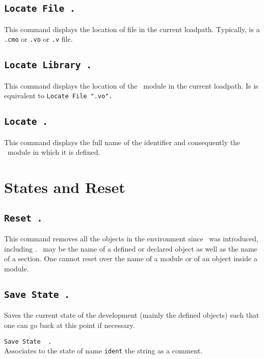 \subsection{\tt Locate File {\str}.}\label{Locate File}
This command displays the location of file {\str} in the current loadpath.
Typically, {\str} is a \texttt{.cmo} or \texttt{.vo} or \texttt{.v} file.

\subsection{\tt Locate Library {\ident}.}
This command displays the location of the \Coq\ module {\ident} in the current
loadpath. Is is equivalent to {\tt Locate File "}{\ident}{\tt .vo".}

\subsection{\tt Locate {\ident}.}
This command displays the full name of the identifier {\ident}
and consequently the \Coq\ module in which it is defined.

\section{States and Reset}

\subsection{\tt Reset \ident.}
This command removes all the objects in the environment since \ident\ 
was introduced, including \ident. \ident\ may be the name of a defined
or declared object as well as the name of a section.  One cannot reset
over the name of a module or of an object inside a module.

\begin{ErrMsgs}
\item {}
\end{ErrMsgs}

\subsection{\tt Save State \ident.}
Saves the current state of the development (mainly the defined
objects) such that one can go back at this point if necessary.

\begin{Variants}
\item {\tt Save State \ident\ \str.} \\ 
  Associates to the state of name {\tt ident} the string {\str} as a
  comment.
\end{Variants}

